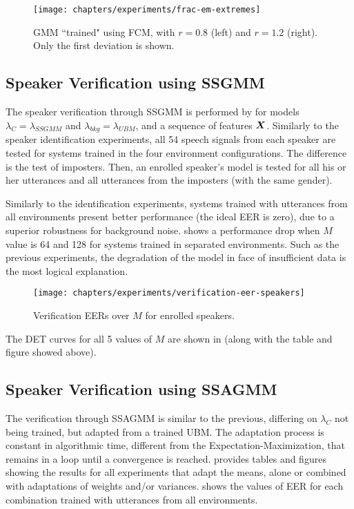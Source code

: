 \begin{figure}[ht]
    \centering
    \texttt{[image: chapters/experiments/frac-em-extremes]}
    \caption{GMM ``trained" using FCM, with $r = 0.8$ (left) and $r = 1.2$ (right). Only the first deviation is shown.}
    \label{fig:frac-em-extremes}
\end{figure}

\subsection{Speaker Verification using SSGMM}

The speaker verification through SSGMM is performed by  for models $\lambda_C = \lambda_{SSGMM}$ and $\lambda_{bkg} = \lambda_{UBM}$, and a sequence of features $\boldsymbol{X}$. Similarly to the speaker identification experiments, all 54 speech signals from each speaker are tested for systems trained in the four environment configurations. The difference is the test of imposters. Then, an enrolled speaker's model is tested for all his or her utterances and all utterances from the imposters (with the same gender).



Similarly to the identification experiments, systems trained with utterances from all environments present better performance (the ideal EER is zero), due to a superior robustness for background noise.  shows a performance drop when $M$ value is 64 and 128 for systems trained in separated environments. Such as the previous experiments, the degradation of the model in face of insufficient data is the most logical explanation.

\begin{figure}[ht]
    \centering
    \texttt{[image: chapters/experiments/verification-eer-speakers]}
    \caption{Verification EERs over $M$ for enrolled speakers.}
    \label{fig:verification-eer-speakers}
\end{figure}

\noindent The DET curves for all 5 values of $M$ are shown in  (along with the table and figure showed above).

\subsection{Speaker Verification using SSAGMM}

The verification through SSAGMM is similar to the previous, differing on $\lambda_C$ not being trained, but adapted from a trained UBM. The adaptation process is constant in algorithmic time, different from the Expectation-Maximization, that remains in a loop until a convergence is reached.  provides tables and figures showing the results for all experiments that adapt the means, alone or combined with adaptations of weights and/or variances.  shows the values of EER for each combination trained with utterances from all environments.

